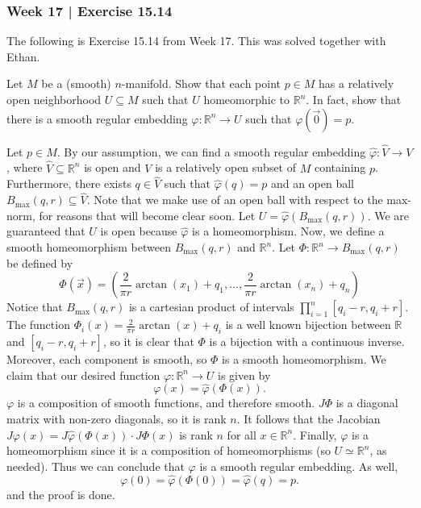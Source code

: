\subsubsection{Week 17 | Exercise 15.14}

The following is Exercise 15.14 from Week 17.
This was solved together with Ethan.

\begin{exr}[num=11.16]
    Let \(M\) be a (smooth) \(n\)-manifold.
    Show that each point \(p \in M\) has a relatively open neighborhood
    \(U \subseteq M\) such that \(U\) homeomorphic to \(\mathbb{R}^n\). In fact,
    show that there is a smooth regular embedding \(\varphi : \mathbb{R}^n \to
    U\) such that \(\varphi (\vec{0}) = p\).
\end{exr}

\begin{pf}[source=Ethan]
Let \(p \in M\). By our assumption, we can find a smooth regular embedding
\(\hat{\varphi}: \hat{V} \to V\), where \(\hat{V} \subseteq \mathbb{R}^n\) is
open and \(V\) is a relatively open subset of \(M\) containing \(p\).
Furthermore, there exists \(q \in \hat{V}\) such that \(\hat{\varphi}(q) = p\)
and an open ball \(B_{\max}(q, r) \subseteq \hat{V}\). Note that we make use of
an open ball with respect to the max-norm, for reasons that will become clear
soon. Let \(U = \hat{\varphi}(B_{\max}(q, r))\). We are guaranteed that \(U\) is
open because \(\hat{\varphi}\) is a homeomorphism. Now, we define a smooth
homeomorphism between \(B_{\max}(q, r)\) and \(\mathbb{R}^n\).
Let \(\Phi : \mathbb{R}^n \to B_{\max}(q, r)\) be defined by
        \[
            \Phi (\vec{x}) = \left( \frac{2}{\pi r}\arctan (x_1) + q_1, ...,
            \frac{2}{\pi r}\arctan (x_n) + q_n\right) 
        \]
        Notice that \(B_{\max}(q, r)\) is a cartesian product of intervals
        \(\prod _{i=1}^n [q_i - r, q_i + r]\). The function \(\Phi_i(x) =
        \frac{2}{\pi r}\arctan (x) + q_i\) is a well known bijection between
        \(\mathbb{R}\) and \([q_i - r, q_i + r]\), so it is clear that \(\Phi\)
        is a bijection with a continuous inverse. Moreover, each component is
        smooth, so \(\Phi\) is a smooth homeomorphism. We claim that our desired
        function \(\varphi: \mathbb{R}^n \to U\) is given by
        \[
            \varphi (x) = \hat{\varphi}(\Phi (x)).
        \]
        \(\varphi\) is a composition of smooth functions, and therefore smooth.
        \(J \Phi\) is a diagonal matrix with non-zero diagonals, so it is rank
        \(n\). It follows that the Jacobian \(J \varphi (x) = J \hat{\varphi}
        (\Phi (x)) \cdot J \Phi (x)\) is rank \(n\) for all \(x \in
        \mathbb{R}^n\). Finally, \(\varphi\) is a homeomorphism since it is a
        composition of homeomorphisms (so \(U \simeq \mathbb{R}^n\), as needed).
        Thus we can conclude that \(\varphi\) is a smooth regular embedding.
        As well,
        \[
            \varphi (0) = \hat{\varphi}(\Phi (0)) = \hat{\varphi}(q) = p.
        \]
        and the proof is done.
\end{pf}
